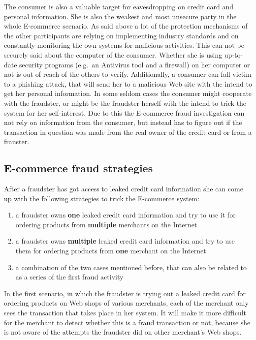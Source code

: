 The consumer is also a valuable target for eavesdropping on credit card and personal information. She is also the weakest and most unsecure party in the whole E-commerce scenario. As said above a lot of the protection mechanisms of the other participants are relying on implementing industry standards and on constantly monitoring the own systems for malicious activities. This can not be securely said about the computer of the consumer. Whether she is using up-to-date security programs (e.g.\ an Antivirus tool and a firewall) on her computer or not is out of reach of the others to verify. Additionally, a consumer can fall victim to a phishing attack, that will send her to a malicious Web site with the intend to get her personal information. In some seldom cases the consumer might cooperate with the fraudster, or might be the fraudster herself with the intend to trick the system for her self-interest. Due to this the E-commerce fraud investigation can not rely on information from the consumer, but instead has to figure out if the transaction in question was made from the real owner of the credit card or from a frauster.


\subsection{E-commerce fraud strategies}
\label{subsec:strategies_fraudster}

After a fraudster has got access to leaked credit card information she can come up with the following strategies to trick the E-commerce system:\@

\begin{enumerate}
  \item a fraudster owns \textbf{one} leaked credit card information and try to use it for ordering products from \textbf{multiple} merchants on the Internet
  \item a fraudster owns \textbf{multiple} leaked credit card information and try to use them for ordering products from \textbf{one} merchant on the Internet
  \item a combination of the two cases mentioned before, that can also be related to as a series of the first fraud activity
\end{enumerate}

In the first scenario, in which the fraudster is trying out a leaked credit card for ordering products on Web shops of various merchants, each of the merchant only sees the transaction that takes place in her system. It will make it more difficult for the merchant to detect whether this is a fraud transaction or not, because she is not aware of the attempts the fraudster did on other merchant's Web shops. \\

